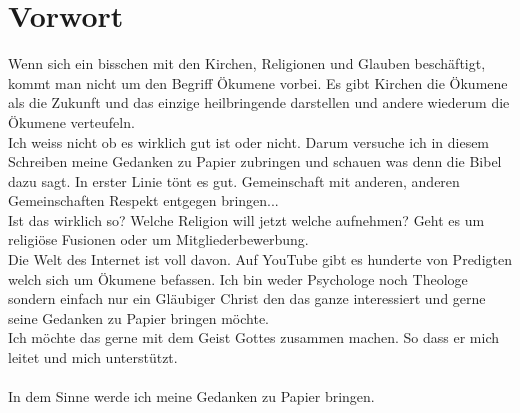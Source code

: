 \section{Vorwort}

Wenn sich ein bisschen mit den Kirchen, Religionen und Glauben beschäftigt, kommt man nicht um den Begriff Ökumene vorbei. Es gibt Kirchen die Ökumene als die Zukunft und das einzige heilbringende darstellen und andere wiederum die Ökumene verteufeln.\\
Ich weiss nicht ob es wirklich gut ist oder nicht. Darum versuche ich in diesem Schreiben meine Gedanken zu Papier zubringen und schauen was denn die Bibel dazu sagt. In erster Linie tönt es gut. Gemeinschaft mit anderen, anderen Gemeinschaften Respekt entgegen bringen...\\
Ist das wirklich so? Welche Religion will jetzt welche aufnehmen? Geht es um religiöse Fusionen oder um Mitgliederbewerbung. \\ 
Die Welt des Internet ist voll davon. Auf YouTube gibt es hunderte von Predigten welch sich um Ökumene befassen. Ich bin weder Psychologe noch Theologe sondern einfach nur ein Gläubiger Christ den das ganze interessiert und gerne seine Gedanken zu Papier bringen möchte.\\
Ich möchte das gerne mit dem Geist Gottes zusammen machen. So dass er mich leitet und mich unterstützt.\\\\

In dem Sinne werde ich meine Gedanken zu Papier bringen.







